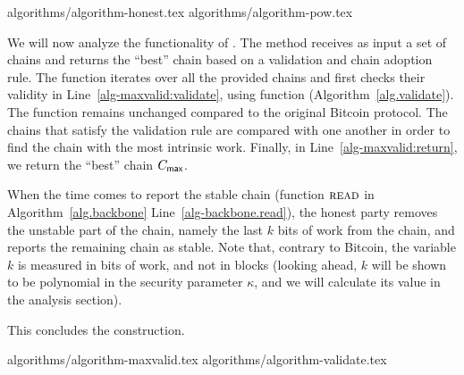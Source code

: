 {algorithms/algorithm-honest.tex}
{algorithms/algorithm-pow.tex}

We will now analyze the functionality of \maxvalid. The method receives as input
a set of chains and returns the ``best'' chain based on a validation and
chain adoption rule. The function iterates over all the provided chains
and first checks their validity in Line~\ref{alg-maxvalid:validate}, using
function \validate (Algorithm~\ref{alg.validate}). The \validate function remains unchanged compared to
the original Bitcoin protocol.
The chains that satisfy the validation rule
are compared with one another in order to find the chain
with the most intrinsic work. Finally, in Line~\ref{alg-maxvalid:return}, we return the
``best'' chain $C_{\textsf{max}}$.

When the time comes to report the stable chain
(function $\textsc{read}$ in Algorithm~\ref{alg.backbone} Line~\ref{alg-backbone.read}),
the honest party removes the unstable part of the chain, namely
the last $k$ bits of work from the chain, and reports
the remaining chain as stable. Note that, contrary to Bitcoin,
the variable $k$ is measured in bits of work, and not in blocks
(looking ahead, $k$ will be shown to be polynomial in the
security parameter $\kappa$, and we will calculate its value
in the analysis section).

This concludes the \poem construction.

{algorithms/algorithm-maxvalid.tex}
{algorithms/algorithm-validate.tex}



